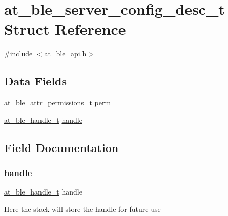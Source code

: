 \hypertarget{structat__ble__server__config__desc__t}{}\section{at\+\_\+ble\+\_\+server\+\_\+config\+\_\+desc\+\_\+t Struct Reference}
\label{structat__ble__server__config__desc__t}


{\ttfamily \#include $<$at\+\_\+ble\+\_\+api.\+h$>$}

\subsection*{Data Fields}
\begin{DoxyCompactItemize}
\item 
\mbox{\hyperlink{at__ble__api_8h_a5d87cd231ea3f9e11846dba7cf75eb61}{at\+\_\+ble\+\_\+attr\+\_\+permissions\+\_\+t}} \mbox{\hyperlink{structat__ble__server__config__desc__t_a339b801a3a93cf9055c72ff39b60472a}{perm}}
\item 
\mbox{\hyperlink{at__ble__api_8h_abd23646d0c662860741f787efc8456f2}{at\+\_\+ble\+\_\+handle\+\_\+t}} \mbox{\hyperlink{structat__ble__server__config__desc__t_ab8b0f353cb6a8d85f0822900e3b7cf35}{handle}}
\end{DoxyCompactItemize}


\subsection{Field Documentation}
\mbox{\label{structat__ble__server__config__desc__t_ab8b0f353cb6a8d85f0822900e3b7cf35}} 
\subsubsection{\texorpdfstring{handle}{handle}}
{\footnotesize\ttfamily \mbox{\hyperlink{at__ble__api_8h_abd23646d0c662860741f787efc8456f2}{at\+\_\+ble\+\_\+handle\+\_\+t}} handle}

Here the stack will store the handle for future use \mbox{\label{structat__ble__server__config__desc__t_a339b801a3a93cf9055c72ff39b60472a}} 

